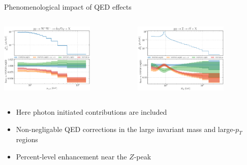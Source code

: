 \documentclass[aspectratio=169, 8pt,t]{beamer}
\begin{document}
\begin{frame}{Phenomenological impact of QED effects}
  \begin{columns}[T]
    \begin{column}{0.49\textwidth}
      \includegraphics[width=0.7\textwidth]{figures/NNPDF_WPWM_14TEV_40_PHENO-internal.pdf}
    \end{column}
    \begin{column}{0.49\textwidth}
      \vspace*{-3.5em}
      \includegraphics[width=0.7\textwidth]{figures/NNPDF_DY_14TEV_40_PHENO-internal.pdf}
    \end{column}
  \end{columns}
  \begin{columns}[T]
    \begin{column}{0.49\textwidth}
      \vspace*{1em}
      \begin{itemize}
        \item Here photon initiated contributions are included
        \item Non-negligable QED corrections in the large invariant mass and large-$p_T$ regions
        \item Percent-level enhancement near the $Z$-peak

\end{itemize}
\end{column}
\end{columns}
\end{frame}
\end{document}

